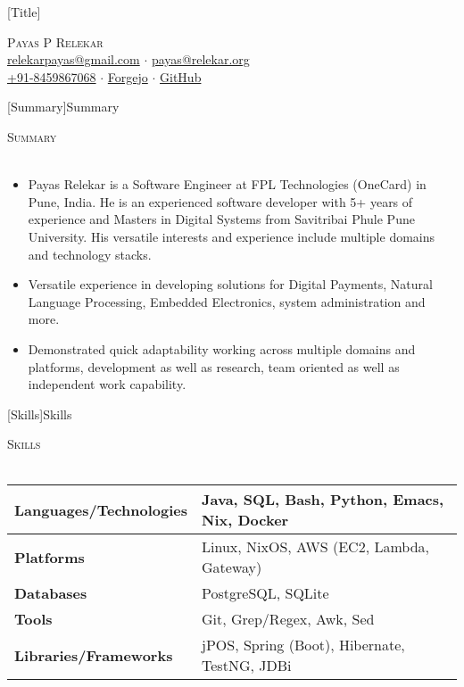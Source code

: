 \documentclass[a4paper]{article}
\newcommand{\lineunder} {
    \vspace*{-8pt} \\
    \hspace*{-18pt} \hrulefill \\
}
\newcommand{\header} [1] {
    {\hspace*{-18pt}\vspace*{6pt} \textsc{#1}}
    \vspace*{-6pt} \lineunder
}
\begin{document}
\vspace*{-40pt}

\vspace*{-10pt}
[Title]{}
\begin{center}
	{\Huge \scshape {Payas P Relekar}}\\
	\href{mailto:relekarpayas@gmail.com}{relekarpayas@gmail.com} $\cdot$ \href{mailto:payas@relekar.org}{payas@relekar.org} \\
	\href{tel:+91-8459867068}{+91-8459867068} $\cdot$ \href{https://git.bhankas.org/payas/}{Forgejo} $\cdot$ \href{https://github.com/bhankas/}{GitHub}\\
\end{center}

[Summary]{Summary}
\header{Summary}
\vspace{1mm}

\begin{itemize} \itemsep 1pt
	\item Payas Relekar is a Software Engineer at FPL Technologies (OneCard) in Pune, India. He is an experienced software developer with 5+ years of experience and Masters in Digital Systems from Savitribai Phule Pune University. His versatile interests and experience include multiple domains and technology stacks.
	\item Versatile experience in developing solutions for Digital Payments, Natural Language Processing, Embedded Electronics, system administration and more.
	\item Demonstrated quick adaptability working across multiple domains and platforms, development as well as research, team oriented as well as independent work capability.
\end{itemize}

[Skills]{Skills}
\header{Skills}
\vspace{1mm}
\bgroup
\setlength{\arrayrulewidth}{0.2mm}
\def\arraystretch{1.2}
\begin{tabularx}{\textwidth}{ | X | X | }
	\hline
	\textbf{Languages/Technologies} & Java, SQL, Bash, Python, Emacs, Nix, Docker  \\
	\hline
	\textbf{Platforms}              & Linux, NixOS, AWS (EC2, Lambda, Gateway)     \\
	\hline
	\textbf{Databases}              & PostgreSQL, SQLite                           \\
	\hline
	\textbf{Tools}                  & Git, Grep/Regex, Awk, Sed                    \\
	\hline
	\textbf{Libraries/Frameworks}   & jPOS, Spring (Boot), Hibernate, TestNG, JDBi \\
	\hline
\end{tabularx}
\egroup
\vspace{2mm}
\end{document}
